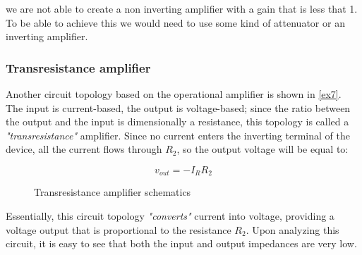 \documentclass[../main.tex]{subfiles}
\begin{document}
we are not able to create a non inverting amplifier with a gain that is less that 1. To be able to achieve this we would need to use some kind of attenuator or an inverting amplifier.\\



\subsubsection{Transresistance amplifier}


Another circuit topology based on the operational amplifier is shown
in \autoref{ex7}.
The input is current-based, the output is voltage-based; since the ratio between the output and the input is dimensionally a resistance, this topology is called a \textit{"transresistance"} amplifier. Since no current enters the inverting terminal of the device, all the current flows through $R_2$, so the output voltage will be equal to:

\begin{equation}
	v_{out} = -I_RR_2
\end{equation}

\begin{figure}[h]
\begin{center}



\label{ex7}
\caption{Transresistance amplifier schematics}	
\end{center}	
\end{figure}


Essentially, this circuit topology \textit{"converts"} current into voltage, providing a voltage output that is proportional to the resistance $R_2$. Upon analyzing this circuit, it is easy to see that both the input and output impedances are very low.
\end{document}
